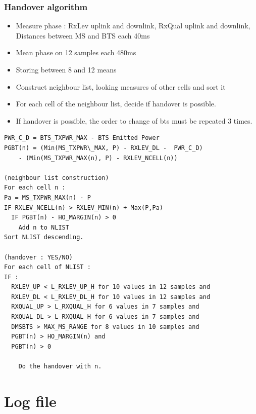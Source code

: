 \documentclass{beamer}
\begin{document}
\begin{frame}
\frametitle{Handover algorithm}
\begin{itemize}
  \item Measure phase : RxLev uplink and downlink, RxQual uplink and downlink, Distances between MS and BTS each 40ms
  \item Mean phase on 12 samples each 480ms
  \item Storing between 8 and 12 means
  \item Construct neighbour list, looking measures of other cells and sort it
  \item For each cell of the neighbour list, decide if handover is possible.
  \item If handover is possible, the order to change of bts must be repeated 3
times.
\end{itemize}
\end{frame}
\begin{frame}[fragile]

{\tiny
\begin{verbatim}
PWR_C_D = BTS_TXPWR_MAX - BTS Emitted Power
PGBT(n) = (Min(MS_TXPWR\_MAX, P) - RXLEV_DL -  PWR_C_D)
    - (Min(MS_TXPWR_MAX(n), P) - RXLEV_NCELL(n))

(neighbour list construction)
For each cell n :
Pa = MS_TXPWR_MAX(n) - P
IF RXLEV_NCELL(n) > RXLEV_MIN(n) + Max(P,Pa)
  IF PGBT(n) - HO_MARGIN(n) > 0
    Add n to NLIST
Sort NLIST descending.

(handover : YES/NO)
For each cell of NLIST :
IF :
  RXLEV_UP < L_RXLEV_UP_H for 10 values in 12 samples and
  RXLEV_DL < L_RXLEV_DL_H for 10 values in 12 samples and
  RXQUAL_UP > L_RXQUAL_H for 6 values in 7 samples and 
  RXQUAL_DL > L_RXQUAL_H for 6 values in 7 samples and
  DMSBTS > MAX_MS_RANGE for 8 values in 10 samples and
  PGBT(n) > HO_MARGIN(n) and
  PGBT(n) > 0

    Do the handover with n.
\end{verbatim}
}

\end{frame}

\section{Log file}
\end{document}

